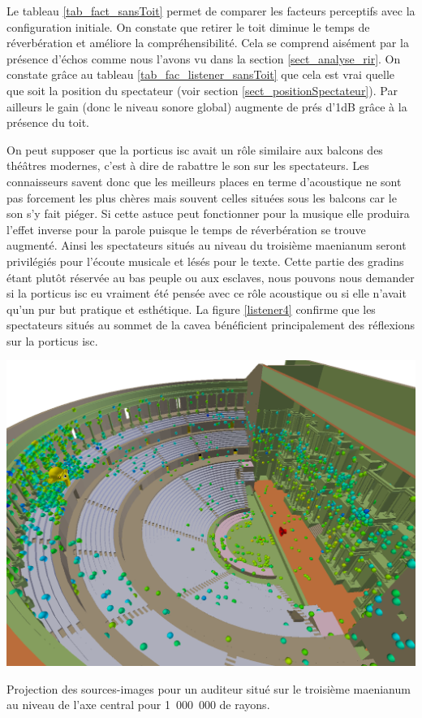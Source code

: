  Le tableau \ref{tab_fact_sansToit} permet de comparer les facteurs perceptifs avec la configuration initiale. On constate que retirer le toit diminue le temps de réverbération et améliore la compréhensibilité. Cela se comprend aisément par la présence d'échos comme nous l'avons vu dans la section \ref{sect_analyse_rir}. On constate grâce au tableau \ref{tab_fac_listener_sansToit} que cela est vrai quelle que soit la position du spectateur (voir section \ref{sect_positionSpectateur}). Par ailleurs le gain (donc le niveau sonore global) augmente de prés d'1dB grâce à la présence du toit. 
 
 

On peut supposer que la \gls{porticus isc} avait un rôle similaire aux balcons des théâtres modernes, c'est à dire de rabattre le son sur les spectateurs. Les connaisseurs savent donc que les meilleurs places en terme d'acoustique ne sont pas forcement les plus chères mais souvent celles situées sous les balcons car le son s'y fait piéger. Si cette astuce peut fonctionner pour la musique elle produira l'effet inverse pour la parole puisque le temps de réverbération se trouve augmenté. Ainsi les spectateurs situés au niveau du troisième \gls{maenianum} seront privilégiés pour l'écoute musicale et lésés pour le texte. Cette partie des gradins étant plutôt réservée au bas peuple ou aux esclaves, nous pouvons nous demander si la \gls{porticus isc} eu vraiment été pensée avec ce rôle acoustique ou si elle n'avait qu'un pur but pratique et esthétique. La figure \ref{listener4} confirme que les spectateurs situés au sommet de la \gls{cavea} bénéficient principalement des réflexions sur la \gls{porticus isc}.
\begin{figureth}
	\includegraphics[width=0.8\linewidth]{images/Listener4}
	\caption{Projection des sources-images pour un auditeur situé sur le troisième \gls{maenianum} au niveau de l'axe central pour 1~000~000 de rayons.}
	\label{listener4}
\end{figureth}

